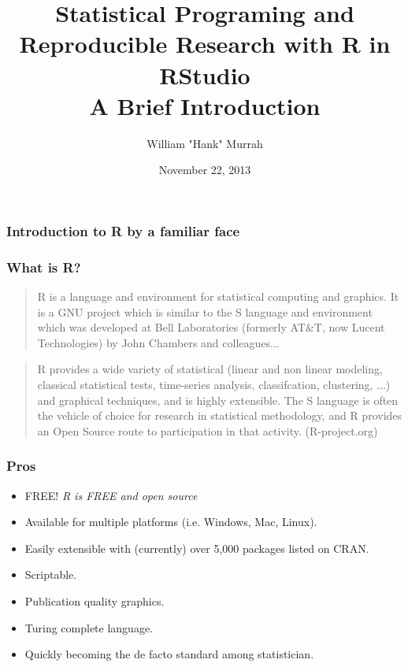 \documentclass{beamer}\usepackage[]{graphicx}\usepackage[]{color}
\title [SP4R: Intro] {Statistical Programing and Reproducible Research with \textbf{R} in \textbf{RStudio} \\ {A Brief Introduction}
}
\author{William "Hank" Murrah}
\date{November 22, 2013}
\begin{document}
\maketitle
% 

\begin{frame}
\frametitle{Introduction to R by a familiar face}




\end{frame}

\begin{frame}
  \frametitle{What is R?}
  \begin{quote}R is a language and environment for statistical computing and graphics. It is a GNU project which is similar to the S language and environment which was developed at Bell Laboratories (formerly AT\&T, now Lucent Technologies) by John Chambers and colleagues...
	\end{quote}
	\pause
	\begin{quote}
	R provides a wide variety of statistical (linear and non linear modeling, classical statistical tests, time-series analysis, classifcation, clustering, ...) and graphical techniques, and is highly extensible. The S language is often the vehicle of choice for research in statistical methodology, and R provides an Open Source route to participation in that activity.
	(R-project.org)
	\end{quote}
\end{frame}
  
\begin{frame}[fragile]
	\frametitle{Pros}
	\begin{itemize}
	\item<+-| alert@+> FREE!
	\textit{	R is FREE and open source}
	\item<+-| alert@+> Available for multiple platforms (i.e. Windows, Mac, Linux).
	\item<+-| alert@+> Easily extensible with (currently) over 5,000 packages listed on CRAN.
	\item<+-| alert@+> Scriptable.
	\item<+-| alert@+> Publication quality graphics.
	\item<+-| alert@+> Turing complete language.
	\item<+-| alert@+> Quickly becoming the de facto standard among statistician.
	\end{itemize}
\end{frame}
\end{document}
